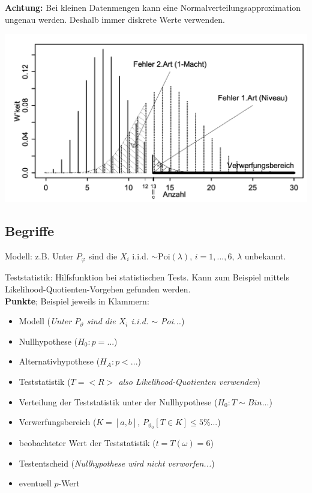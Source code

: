 \textbf{Achtung:} Bei kleinen Datenmengen kann eine Normalverteilungsapproximation ungenau werden. Deshalb immer diskrete Werte verwenden.

\includegraphics[width=.8\textwidth]{images/normal.png}

\subsection{Begriffe}

Modell: z.B. Unter $P_\varphi$ sind die $X_i$ i.i.d. $\sim\text{Poi}(\lambda)$, $i=1, ..., 6$, $\lambda$ unbekannt.

Teststatistik: Hilfsfunktion bei statistischen Tests. Kann zum Beispiel mittels Likelihood-Quotienten-Vorgehen gefunden werden.\\

\textbf{Punkte}; Beispiel jeweils in Klammern:
\begin{itemize}
	 \item Modell (\textit{Unter $P_\vartheta$ sind die $X_i$ i.i.d. $\sim$ Poi...})
	 \item Nullhypothese (\textit{$H_0: p = ...$})
	 \item Alternativhypothese (\textit{$H_A: p < ...$})
	 \item Teststatistik  (\textit{$T= <R>$ also Likelihood-Quotienten verwenden})
	 \item Verteilung der Teststatistik unter der Nullhypothese (\textit{$H_0: T \sim Bin...$})
	 \item Verwerfungsbereich ($K = [a, b]$, $P_{\vartheta_0}[T\in K] \leq 5\%...$)
	 \item beobachteter Wert der Teststatistik ($t=T(\omega)=6$)
	 \item Testentscheid (\textit{Nullhypothese wird nicht verworfen...})
	 \item eventuell $p$-Wert
\end{itemize}

